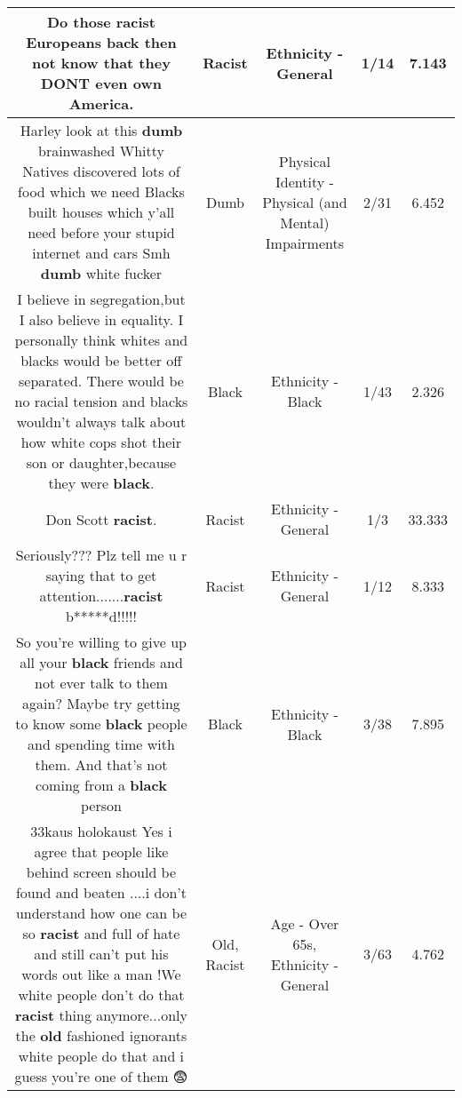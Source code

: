 \documentclass[11pt]{article}
\newlength\mylength
\begin{document}
\begin{center}
\begin{longtable}{|C{.65\mylength}|C{.30\mylength}|C{.12\mylength}|C{.12\mylength}|C{.12\mylength}|}
  \small Do those \textbf{racist} Europeans back then not know that they DONT even own America.\normalsize   & Racist & Ethnicity - General & 1/14 & 7.143 \\  \hline
  \small Harley look at this \textbf{dumb} brainwashed Whitty Natives discovered lots of food which we need Blacks built houses which y'all need before your stupid internet and cars Smh \textbf{dumb} white  fucker\normalsize   & Dumb & Physical Identity - Physical (and Mental) Impairments & 2/31 & 6.452 \\  \hline
  \small I believe in segregation,but I also believe in equality. I personally think whites and blacks would be better off separated. There would be no racial tension and blacks wouldn't always talk about how white cops shot their son or daughter,because they were \textbf{black}.\normalsize   & Black & Ethnicity - Black & 1/43 & 2.326 \\  \hline
  \small Don Scott \textbf{racist}.\normalsize   & Racist & Ethnicity - General & 1/3 & 33.333 \\  \hline
  \small Seriously??? Plz tell me u r saying that to get attention.......\textbf{racist} b*****d!!!!!\normalsize   & Racist & Ethnicity - General & 1/12 & 8.333 \\  \hline
  \small So you're willing to give up all your \textbf{black} friends and not ever talk to them again? Maybe try getting to know some \textbf{black} people and spending time with them. And that's not coming from a \textbf{black} person\normalsize   & Black & Ethnicity - Black & 3/38 & 7.895 \\  \hline
  \small 33kaus holokaust Yes i agree that people like behind screen should be found and beaten ....i don't understand how one can be so \textbf{racist} and full of hate and still can't put his words out like a man !We white people don't do that \textbf{racist} thing anymore...only the \textbf{old} fashioned ignorants white people do that and i guess you're one of them 😨\normalsize   & Old, Racist & Age - Over 65s, Ethnicity - General & 3/63 & 4.762 \\  \hline

\end{longtable}
\end{center}
\end{document}
